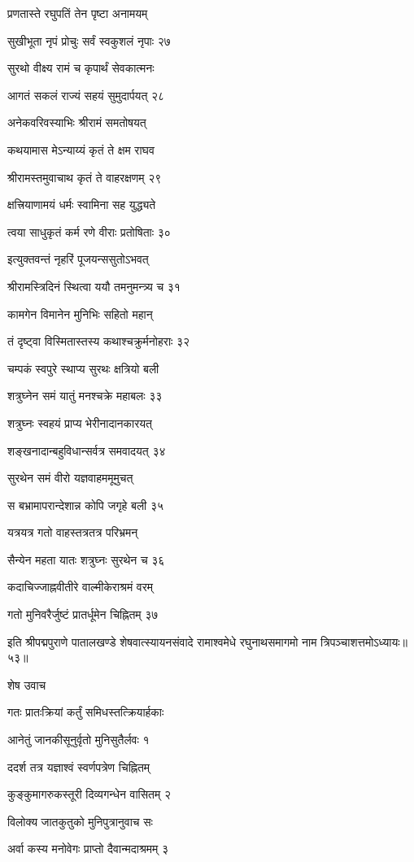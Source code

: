 प्रणतास्ते रघुपतिं तेन पृष्टा अनामयम्

सुखीभूता नृपं प्रोचुः सर्वं स्वकुशलं नृपाः २७

सुरथो वीक्ष्य रामं च कृपार्थं सेवकात्मनः

आगतं सकलं राज्यं सहयं सुमुदार्पयत् २८

अनेकवरिवस्याभिः श्रीरामं समतोषयत्

कथयामास मेऽन्याय्यं कृतं ते क्षम राघव

श्रीरामस्तमुवाचाथ कृतं ते वाहरक्षणम् २९

क्षत्त्रियाणामयं धर्मः स्वामिना सह युद्ध्यते

त्वया साधुकृतं कर्म रणे वीराः प्रतोषिताः ३०

इत्युक्तवन्तं नृहरिं पूजयन्ससुतोऽभवत्

श्रीरामस्त्रिदिनं स्थित्वा ययौ तमनुमन्त्र्य च ३१

कामगेन विमानेन मुनिभिः सहितो महान्

तं दृष्ट्वा विस्मितास्तस्य कथाश्चक्रुर्मनोहराः ३२

चम्पकं स्वपुरे स्थाप्य सुरथः क्षत्रियो बली

शत्रुघ्नेन समं यातुं मनश्चक्रे महाबलः ३३

शत्रुघ्नः स्वहयं प्राप्य भेरीनादानकारयत्

शङ्खनादान्बहुविधान्सर्वत्र समवादयत् ३४

सुरथेन समं वीरो यज्ञवाहममूमुचत्

स बभ्रामापरान्देशान्न कोपि जगृहे बली ३५

यत्रयत्र गतो वाहस्तत्रतत्र परिभ्रमन्

सैन्येन महता यातः शत्रुघ्नः सुरथेन च ३६

कदाचिज्जाह्नवीतीरे वाल्मीकेराश्रमं वरम्

गतो मुनिवरैर्जुष्टं प्रातर्धूमेन चिह्नितम् ३७

इति श्रीपद्मपुराणे पातालखण्डे शेषवात्स्यायनसंवादे रामाश्वमेधे रघुनाथसमागमो नाम त्रिपञ्चाशत्तमोऽध्यायः॥५३॥


शेष उवाच

गतः प्रातःक्रियां कर्तुं समिधस्तत्क्रियार्हकाः

आनेतुं जानकीसूनुर्वृतो मुनिसुतैर्लवः १

ददर्श तत्र यज्ञाश्वं स्वर्णपत्रेण चिह्नितम्

कुङ्कुमागरुकस्तूरी दिव्यगन्धेन वासितम् २

विलोक्य जातकुतुको मुनिपुत्रानुवाच सः

अर्वा कस्य मनोवेगः प्राप्तो दैवान्मदाश्रमम् ३

